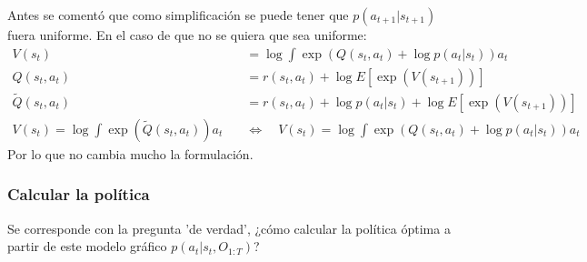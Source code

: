 Antes se comentó que como simplificación se puede tener que $p(a_{t+1}|s_{t+1})$ fuera uniforme.
En el caso de que no se quiera que sea uniforme:
\begin{align}
    V ( s _ { t } ) &= \operatorname { log } \int \operatorname { exp } ( Q ( s _ { t } , a _ { t } )
+ \operatorname { log } p ( a _ { t } | s _ { t } ) ) a _ { t }\\
    Q ( s _ { t } , a _ { t } ) &= r ( s _ { t } , a _ { t } ) + \operatorname { log } E [
\operatorname { exp } ( V ( s _ { t + 1 } ) ) ]\\
    \tilde { Q } ( s _ { t } , a _ { t } ) &= r ( s _ { t } , a _ { t } ) + \operatorname { log } p (
a _ { t } | s _ { t } ) + \operatorname { log } E [ \operatorname { exp } ( V ( s _ { t + 1 } ) )
]\\
V ( s _ { t } ) = \operatorname { log } \int \operatorname { exp } ( \tilde { Q } ( s _ { t } , a
    _ { t } ) ) a _ { t } \quad &\Leftrightarrow \quad V ( s _ { t } ) = \operatorname { log } \int \operatorname { exp } ( Q ( s _ { t } , a _ { t } ) + \operatorname { log } p ( a _ { t } | s _ { t } ) ) a _ { t }
\end{align}
Por lo que no cambia mucho la formulación.

\subsubsection{Calcular la política}%
\label{ssub:calcular_la_política}

Se corresponde con la pregunta 'de verdad', ¿cómo calcular la política óptima a partir de
este modelo gráfico $p(a_t|s_t,O_{1:T})$?

